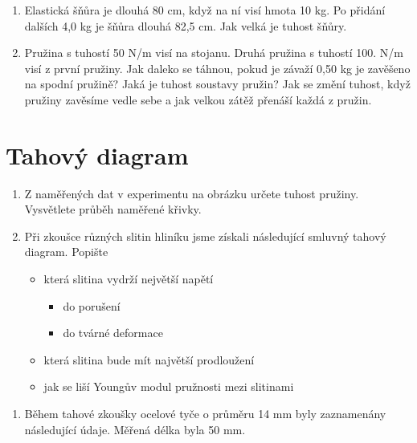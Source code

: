 \documentclass[letterpaper,10pt,english]{jupyterBook}
\begin{document}
{{\begin{enumerate}
\item {} 
\sphinxAtStartPar
Elastická šňůra je dlouhá 80 cm, když na ní visí hmota 10 kg. Po přidání dalších 4,0 kg je šňůra dlouhá 82,5 cm. Jak velká je tuhost šňůry.

\item {} 
\sphinxAtStartPar
Pružina s tuhostí 50 N/m visí na stojanu. Druhá pružina s tuhostí 100. N/m visí z první pružiny. Jak daleko se táhnou, pokud je závaží
0,50 kg je zavěšeno na spodní pružině? Jaká je tuhost soustavy pružin? Jak se změní tuhost, když pružiny zavěsíme vedle sebe a jak velkou zátěž přenáší každá z pružin.

\end{enumerate}


\section{Tahový diagram}
\label{\detokenize{Cviceni/C2:tahovy-diagram}}\begin{enumerate}
%
\item {} 
\sphinxAtStartPar
Z naměřených dat v experimentu na obrázku určete tuhost pružiny. Vysvětlete průběh naměřené křivky.

\noindent{}

\item {} 
\sphinxAtStartPar
Při zkoušce různých slitin hliníku jsme získali následující smluvný tahový diagram. Popište
\begin{itemize}
\item {} 
\sphinxAtStartPar
která slitina vydrží největší napětí
\begin{itemize}
\item {} 
\sphinxAtStartPar
do porušení

\item {} 
\sphinxAtStartPar
do tvárné deformace

\end{itemize}

\item {} 
\sphinxAtStartPar
která slitina bude mít najvětší prodloužení

\item {} 
\sphinxAtStartPar
jak se liší Youngův modul pružnosti mezi slitinami

\end{itemize}

\end{enumerate}
\begin{enumerate}
%
\setcounter{enumi}{2}
\item {} 
\sphinxAtStartPar
Během tahové zkoušky ocelové tyče o průměru 14 mm byly zaznamenány následující údaje. Měřená délka byla 50 mm.


\end{enumerate}}}
\end{document}
